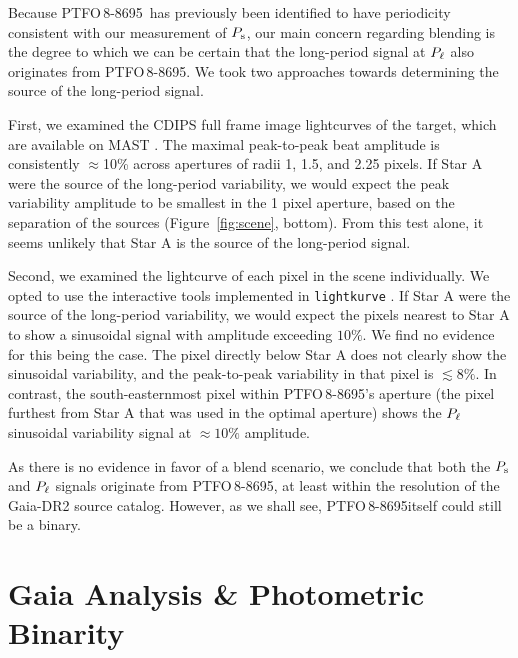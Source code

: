\documentclass[12pt,twocolumn,tighten]{aastex62}
\newcommand{\ptfo}{PTFO$\,$8-8695}
\begin{document}
Because \ptfo\ has previously been identified to have periodicity
consistent with our measurement of $P_{\rm s}$, our main concern
regarding blending is the degree to which we can be certain that the
long-period signal at $P_{\rm \ell}$ also originates from \ptfo.
We took two approaches towards determining the source of the
long-period signal.

First, we examined the CDIPS full frame image lightcurves of the
target, which are available on MAST \citep{bouma_cluster_2019}.  The
maximal peak-to-peak beat amplitude is consistently $\approx$10\%
across apertures of radii 1, 1.5, and 2.25 pixels.  If Star A were the
source of the long-period variability, we would expect the peak
variability amplitude to be smallest in the 1 pixel aperture, based on
the separation of the sources (Figure~\ref{fig:scene}, bottom).  From
this test alone, it seems unlikely that Star A is the source of the
long-period signal.

Second, we examined the lightcurve of each pixel in the scene
individually.  We opted to use the interactive tools implemented in
\texttt{lightkurve} \citep{lightkurve_2018}.  If Star A were the
source of the long-period variability, we would expect the pixels
nearest to Star A to show a sinusoidal signal with amplitude exceeding
$10\%$.  We find no evidence for this being the case.  The pixel
directly below Star A does not clearly show the sinusoidal
variability, and the peak-to-peak variability in that pixel is
$\lesssim 8\%$.  In contrast, the south-easternmost pixel within
\ptfo's aperture (the pixel furthest from Star A that was used in the
optimal aperture) shows the $P_{\rm \ell}$ sinusoidal variability
signal at $\approx 10\%$ amplitude.

As there is no evidence in favor of a blend scenario, we conclude that
both the $P_{\rm s}$ and $P_{\rm \ell}$ signals originate from \ptfo,
at least within the resolution of the Gaia-DR2 source catalog.
However, as we shall see, \ptfo itself could still be a binary.


\section{Gaia Analysis \& Photometric Binarity}
\label{sec:gaia}
\end{document}
